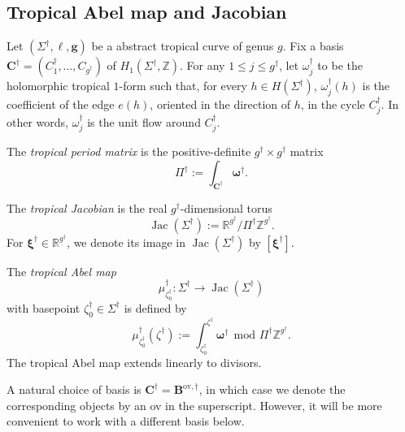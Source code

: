 \documentclass[12pt]{amsart}
\numberwithin{equation}{section}
\theoremstyle{definition}
\newcommand{\Z}{\mathbb{Z}}
\newcommand{\R}{\mathbb{R}}
\def\trop{\dagger}
\def\jac{{\operatorname{Jac}}}
\def\vecptjac{\bm{\xi}}
\def\ptSig{\zeta}
\def\ptSigT{\zeta^\trop}
\def\baseptT{{\ptSig_0^\trop}}
\def\mcurve{\Sigma}
\def\tropmcurve{\mcurve^\trop}
\begin{document}
\subsection{Tropical Abel map and Jacobian}\label{sec:tropical_jacobian}
Let $(\tropmcurve,\ell,\bm g)$ be a abstract tropical curve of genus $g$. Fix a basis $\bm C^\trop = (C_1^\trop,\dots,C_{g^\trop})$ of $H_1(\tropmcurve,\Z)$. For any $1 \leq j \leq g^\trop$, let $\omega_j^\trop$ to be the holomorphic tropical $1$-form
such that, for every $h\in H(\tropmcurve)$,
$\omega_j^{\trop}(h)$ is the coefficient of the edge $e(h)$, oriented in the direction of $h$, in the cycle $C_j^\trop$. In other words,
$\omega_j^{\trop}$ is the unit flow around $C_j^\trop$.



The \emph{tropical period matrix} is the positive-definite $g^\trop\times g^\trop$ matrix
\[
\Pi^{\trop}
:=
\int_{\bm C^{\trop}}\bm\omega^{\trop}.
\]

The \emph{tropical Jacobian} is the real
$g^\trop$-dimensional torus
\[
\jac(\tropmcurve)
:=
\R^{g^\trop}/\Pi^{\trop}\Z^{g^\trop}.
\]
For $\vecptjac^\trop\in\R^{g^\trop}$, we denote its image in $\jac(\tropmcurve)$ by
\(
[\vecptjac^\trop].
\)

The \emph{tropical Abel map} 
\[
\mu^{\trop}_\baseptT : \tropmcurve \rightarrow \jac(\tropmcurve)
\]
with basepoint $\baseptT \in \tropmcurve$ is defined by
\[
\mu_\baseptT^{\trop}(\ptSigT) := \int_\baseptT^{\ptSigT} \bm \omega^{\trop} \ \ \text{mod }  \Pi^{\trop} \Z^{g^\trop}.
\]
The tropical Abel map extends linearly to divisors.

A natural choice of basis is $\bm C^\trop = \bm B^{\mathrm{ov},\trop}$, in which case we denote the corresponding objects by an ov in the superscript. However, it will be more convenient to work with a different basis below.
\end{document}
